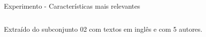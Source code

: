 \begin{frame}{Experimento - Características mais relevantes}
\begin{table}[ht]
\begin{tabular}{c|c|c|c|c}
	\end{tabular}
	\end{table}
	{\selectFont Extraído do subconjunto 02 com textos em inglês e com 5 autores.}
\end{frame}
